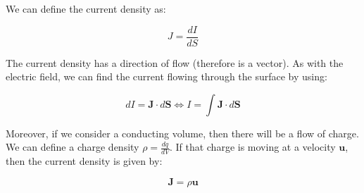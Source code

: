 \documentclass{article}
\begin{document}
\begin{definition}
    We can define the current density as:

    \[ J = \frac{dI}{dS} \]
\end{definition}

The current density has a direction of flow (therefore is a vector). As with the electric field, we can find the current flowing through the surface by using:

\[ dI = \mathbf{J} \cdot d\mathbf{S} \iff I = \int \mathbf{J} \cdot d\mathbf{S} \]

Moreover, if we consider a conducting volume, then there will be a flow of charge. We can define a charge density $\rho = \frac{dq}{dV}$. If that charge is moving at a velocity $\mathbf{u}$, then the current density is given by:

\[ \mathbf{J} = \rho\mathbf{u} \]
\end{document}
